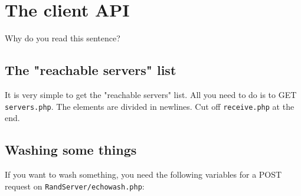 \documentclass[letterpaper,twoside]{scrartcl}
\begin{document}
 \newpage



 \section{The client API}
  Why do you read this sentence?

  \subsection{The "reachable servers" list}
   It is very simple to get the "reachable servers" list. 
   All you need to do is to GET \texttt{servers.php}. 
   The elements are divided in newlines. 
   Cut off \texttt{receive.php} at the end. 
   \newline

   \newline\newline


  \subsection{Washing some things}
   If you want to wash something, you need the following variables for a POST request on \texttt{RandServer/echowash.php}:
   \newline
   
\end{document}
